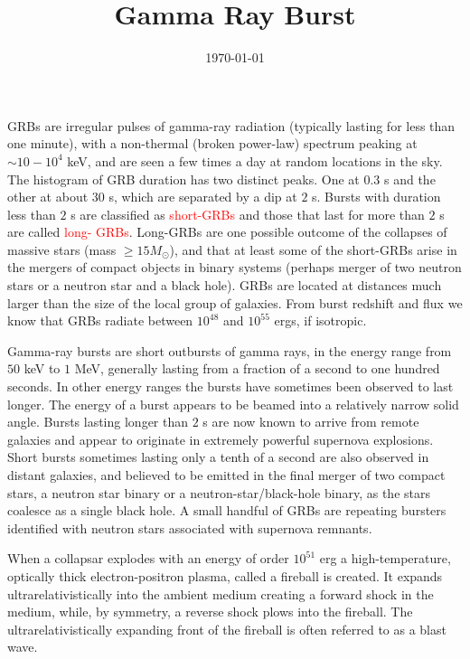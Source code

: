 \documentclass[12pt,a4paper]{article}
\title{Gamma Ray Burst}
\author{}
\date{\today}
\begin{document}
\maketitle

\cite{2015PhR...561....1K} GRBs are irregular pulses of gamma-ray radiation (typically lasting for less than one minute), with a non-thermal (broken power-law) spectrum peaking at $\sim10 - 10^4$ keV, and are seen a few times a day at random locations in the sky. The histogram of GRB duration has two distinct peaks. One at $0.3$ s and the other at about $30$ s, which are separated by a dip at $2$ s. Bursts with duration less than $2$ s are classified as \textcolor{red}{short-GRBs} and those that last for more than $2$ s are called \textcolor{red}{long- GRBs}. Long-GRBs are one possible outcome of the collapses of massive stars (mass $\geqslant 15 M_\odot$), and that at least some of the short-GRBs arise in the mergers of compact objects in binary systems (perhaps merger of two neutron stars or a neutron star and a black hole). GRBs are located at distances much larger than the size of the local group of galaxies. From burst redshift and flux we know that GRBs radiate between $10^{48}$ and $10^{55}$ ergs, if isotropic.

\cite{harwit2006astrophysical} Gamma-ray bursts are short outbursts of gamma rays, in the energy range from $50$ keV to $1$ MeV, generally lasting from a fraction of a second to one hundred seconds. In other energy ranges the bursts have sometimes been observed to last longer. The energy of a burst appears to be beamed into a relatively narrow solid angle. Bursts lasting longer than $2$ s are now known to arrive from remote galaxies and appear to originate in extremely powerful supernova explosions. Short bursts sometimes lasting only a tenth of a second are also observed in distant galaxies, and believed to be emitted in the final merger of two compact stars, a neutron star binary or a neutron-star/black-hole binary, as the stars coalesce as a single black hole. A small handful of GRBs are repeating bursters identified with neutron stars associated with supernova remnants.


When a collapsar explodes with an energy of order $10^{51}$ erg a high-temperature, optically thick electron-positron plasma, called a fireball is created. It expands ultrarelativistically into the ambient medium creating a forward shock in the medium, while, by symmetry, a reverse shock plows into the fireball. The ultrarelativistically expanding front of the fireball is often referred to as a blast wave. 
\end{document}
